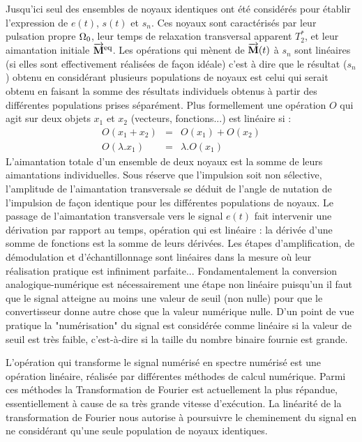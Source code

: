 Jusqu'ici seul des ensembles de noyaux identiques ont été considérés pour établir 
l'expression de $e(t)$, $s(t)$ et $s_n$. 
Ces noyaux sont caractérisés par leur pulsation 
propre $\Omega_0$, leur temps de relaxation transversal apparent $T_2^*$, 
et leur aimantation initiale $\overrightarrow{\mathbf{M}}^{\mbox{\footnotesize{eq}}}$. 
Les opérations qui mènent de $\overrightarrow{\mathbf{M}} (t)$ à $s_n$ sont linéaires (si elles sont effectivement 
réalisées de façon idéale) c'est à dire que le résultat ($s_n$) obtenu en considérant plusieurs 
populations de noyaux est celui qui serait obtenu en faisant la somme des résultats 
individuels obtenus à partir des différentes populations prises séparément. 
Plus formellement une opération $O$ qui agit sur deux objets $x_1$ et $x_2$ 
(vecteurs, fonctions...) est linéaire si :
\begin{eqnarray}
O(x_1 + x_2) & = & O(x_1) + O(x_2) \\
O(\lambda . x_1) & = & \lambda . O(x_1)
\end{eqnarray}
L'aimantation totale d'un ensemble de deux noyaux est la somme de leurs aimantations 
individuelles. 
Sous réserve que l'impulsion soit non sélective, l'amplitude de 
l'aimantation transversale se déduit de l'angle de nutation de 
l'impulsion de façon identique pour les 
différentes populations de noyaux. 
Le passage de l'aimantation 
transversale vers le signal $e(t)$ fait intervenir une dérivation par rapport au temps, 
opération qui est linéaire : la dérivée d'une somme de fonctions est la somme de leurs 
dérivées. 
Les étapes d'amplification, de démodulation et d'échantillonnage sont linéaires 
dans la mesure où leur réalisation pratique est infiniment parfaite... 
Fondamentalement la conversion analogique-numérique est nécessairement une étape non linéaire 
puisqu'un il faut que le signal atteigne au moins une valeur de seuil (non nulle) pour 
que le convertisseur donne autre chose que la valeur numérique nulle. 
D'un point de vue pratique la "numérisation" du signal est considérée comme linéaire 
si la valeur de seuil est très faible,
c'est-à-dire si la taille du nombre binaire fournie est grande. 

L'opération qui transforme le signal numérisé en spectre numérisé est une opération 
linéaire, réalisée par différentes méthodes de calcul numérique. 
Parmi ces méthodes la Transformation de Fourier est actuellement la plus répandue, 
essentiellement à cause de sa très grande vitesse d'exécution. 
La linéarité de la transformation de Fourier nous autorise à poursuivre le 
cheminement du signal en ne considérant qu'une seule population de noyaux identiques.

